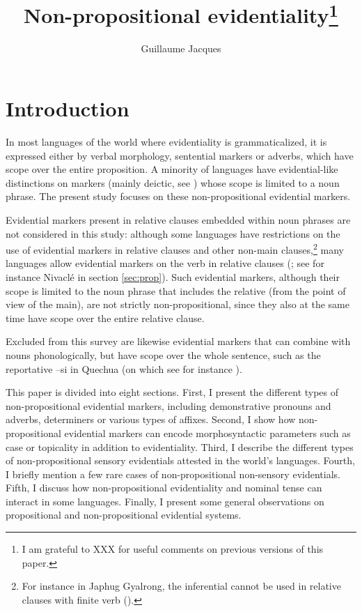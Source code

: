 \documentclass[oneside,a4paper,11pt]{article}
\newcommand{\ipa}[1]{{\phon \mbox{#1}}} %
\begin{document}
 
\sloppy

\title{Non-propositional evidentiality\footnote{I am grateful to XXX for useful comments on previous versions of this paper.}}
\author{Guillaume Jacques}
\maketitle

\section{Introduction}
In most languages of the world where evidentiality is grammaticalized, it is expressed either by verbal morphology, sentential markers or adverbs, which have scope over the entire proposition. A minority of languages have evidential-like distinctions on markers (mainly deictic, see \citealt[130]{aikhenvald06}) whose scope is limited to a noun phrase. The present study focuses on these non-propositional evidential markers.

Evidential markers present in relative clauses embedded within noun phrases are not considered in this study: although some languages have restrictions on the use of evidential markers in relative clauses and other non-main clauses,\footnote{For instance in Japhug Gyalrong, the inferential cannot be used in relative clauses with finite verb (\citealt{jacques16relatives}).} many languages allow evidential markers on the verb in relative clauses (\citealt[253-6]{aikhenvald06}; see for instance Nivaclé in section \ref{sec:prop}). Such evidential markers, although their scope is limited to the noun phrase that includes the relative (from the point of view of the main), are not strictly non-propositional, since they also at the same time have scope over the entire relative clause.


Excluded from this survey are likewise evidential markers that can combine with nouns phonologically, but have scope over the whole sentence, such as the reportative  \ipa{--si} in Quechua (on which see for instance \citealt{faller02cuzco}).

 
This paper is divided into eight sections.  First, I present the different types of   non-propositional evidential markers, including demonstrative pronouns and adverbs, determiners or various types of affixes. Second,  I show how non-propositional evidential markers can encode  morphosyntactic parameters such as case or topicality in addition to evidentiality. Third, I describe the different types of non-propositional sensory evidentials attested in the world's languages. Fourth, I briefly mention a few rare cases of non-propositional non-sensory evidentials. Fifth, I discuss how non-propositional evidentiality and nominal tense can interact in some languages. Finally, I present some general observations on propositional and non-propositional evidential systems.
\end{document}
